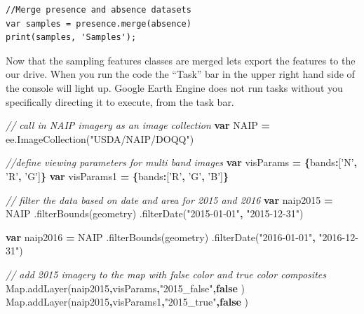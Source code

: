 \documentclass[]{article}
\newenvironment{Shaded}{\begin{snugshade}}{\end{snugshade}}
\newcommand{\KeywordTok}[1]{\textcolor[rgb]{0.13,0.29,0.53}{\textbf{#1}}}
\newcommand{\DataTypeTok}[1]{\textcolor[rgb]{0.13,0.29,0.53}{#1}}
\newcommand{\StringTok}[1]{\textcolor[rgb]{0.31,0.60,0.02}{#1}}
\newcommand{\CommentTok}[1]{\textcolor[rgb]{0.56,0.35,0.01}{\textit{#1}}}
\newcommand{\VariableTok}[1]{\textcolor[rgb]{0.00,0.00,0.00}{#1}}
\newcommand{\OperatorTok}[1]{\textcolor[rgb]{0.81,0.36,0.00}{\textbf{#1}}}
\newcommand{\AttributeTok}[1]{\textcolor[rgb]{0.77,0.63,0.00}{#1}}
\newcommand{\NormalTok}[1]{#1}
\begin{document}
\begin{verbatim}
//Merge presence and absence datasets
var samples = presence.merge(absence)
print(samples, 'Samples');
\end{verbatim}

Now that the sampling features classes are merged lets export the
features to the our drive. When you run the code the ``Task'' bar in the
upper right hand side of the console will light up. Google Earth Engine
does not run tasks without you specifically directing it to execute,
from the task bar.

\begin{Shaded}
\begin{Highlighting}[]
\CommentTok{// call in NAIP imagery as an image collection }
\KeywordTok{var}\NormalTok{ NAIP }\OperatorTok{=} \VariableTok{ee}\NormalTok{.}\AttributeTok{ImageCollection}\NormalTok{(}\StringTok{"USDA/NAIP/DOQQ"}\NormalTok{)}

\CommentTok{//define viewing parameters for multi band images }
\KeywordTok{var}\NormalTok{ visParams }\OperatorTok{=} \OperatorTok{\{}\DataTypeTok{bands}\OperatorTok{:}\NormalTok{[}\StringTok{'N'}\OperatorTok{,} \StringTok{'R'}\OperatorTok{,} \StringTok{'G'}\NormalTok{]}\OperatorTok{\}}
\KeywordTok{var}\NormalTok{ visParams1 }\OperatorTok{=} \OperatorTok{\{}\DataTypeTok{bands}\OperatorTok{:}\NormalTok{[}\StringTok{'R'}\OperatorTok{,} \StringTok{'G'}\OperatorTok{,} \StringTok{'B'}\NormalTok{]}\OperatorTok{\}}


\CommentTok{// filter the data based on date and area for 2015 and 2016 }
\KeywordTok{var}\NormalTok{ naip2015 }\OperatorTok{=}\NormalTok{ NAIP}
\NormalTok{  .}\AttributeTok{filterBounds}\NormalTok{(geometry)}
\NormalTok{  .}\AttributeTok{filterDate}\NormalTok{(}\StringTok{"2015-01-01"}\OperatorTok{,} \StringTok{"2015-12-31"}\NormalTok{)}

\KeywordTok{var}\NormalTok{ naip2016 }\OperatorTok{=}\NormalTok{ NAIP}
\NormalTok{  .}\AttributeTok{filterBounds}\NormalTok{(geometry)}
\NormalTok{  .}\AttributeTok{filterDate}\NormalTok{(}\StringTok{"2016-01-01"}\OperatorTok{,} \StringTok{"2016-12-31"}\NormalTok{)}
  

\CommentTok{// add 2015 imagery to the map with false color and true color composites}
\VariableTok{Map}\NormalTok{.}\AttributeTok{addLayer}\NormalTok{(naip2015}\OperatorTok{,}\NormalTok{visParams}\OperatorTok{,}\StringTok{"2015_false"}\OperatorTok{,}\KeywordTok{false}\NormalTok{ )}
\VariableTok{Map}\NormalTok{.}\AttributeTok{addLayer}\NormalTok{(naip2015}\OperatorTok{,}\NormalTok{visParams1}\OperatorTok{,}\StringTok{"2015_true"}\OperatorTok{,}\KeywordTok{false}\NormalTok{ )}


\end{Highlighting}
\end{Shaded}
\end{document}
